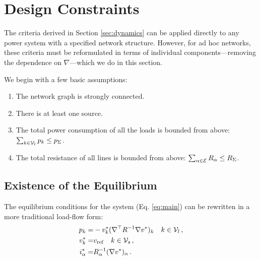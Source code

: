 \documentclass[letterpaper, 10 pt, conference]{ieeeconf}
\begin{document}
\section{Design Constraints}\label{sec:existence} 

The criteria derived in Section \ref{sec:dynamics} can be applied directly to any power system with a specified network structure. However, for ad hoc networks, these criteria must be reformulated in terms of individual components---removing the dependence on $\nabla$---which we do in this section.

We begin with a few basic assumptions:
\begin{enumerate}
\item The network graph is strongly connected. \label{cond:conn}
\item There is at least one source. \label{cond:gen}
\item The total power consumption of all the loads is bounded from above: $\sum_{k\in {\cal V}_l} p_k \leq p_\Sigma$.
\item The total resistance of all lines is bounded from above: $\sum_{\alpha \in {\cal E}} R_\alpha \leq R_\Sigma$.
\end{enumerate}

\subsection{Existence of the Equilibrium}

The equilibrium conditions for the system (Eq. \eqref{eq:main}) can be rewritten in a more traditional load-flow form:
\begin{subequations}\label{eq:equi}
\begin{align}
    p_k  = &  -v_k^*(\nabla^\top R^{-1}\nabla v^*)_k \quad k \in {\cal V}_l\,, \\
    v_k^* =& v_{\mathrm{ref}} \quad k \in {\cal V}_s\,, \\
    i_\alpha^* = & R_\alpha^{-1}(\nabla v^*)_\alpha\,.
\end{align}
\end{subequations}
\end{document}
